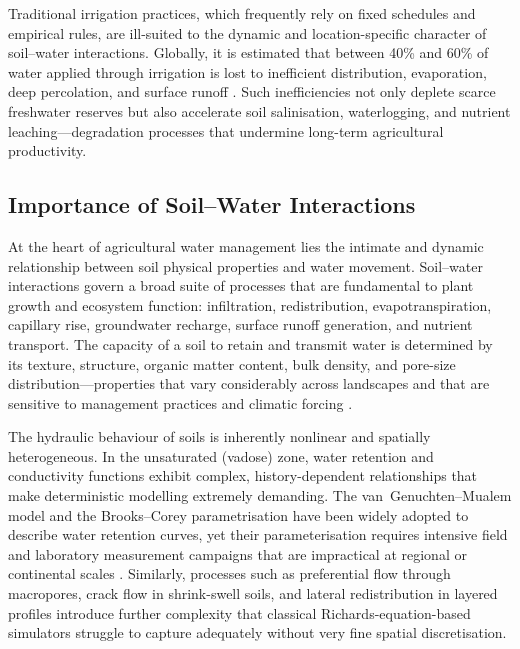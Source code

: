 \documentclass[land,article,submit,pdftex,moreauthors]{Definitions/mdpi}
\numberwithin{equation}{section}
\begin{document}
Traditional irrigation practices, which frequently rely on fixed schedules and empirical rules, are ill-suited to the dynamic and location-specific character of soil--water interactions. Globally, it is estimated that between 40\% and 60\% of water applied through irrigation is lost to inefficient distribution, evaporation, deep percolation, and surface runoff \citep{gleick2014water}. Such inefficiencies not only deplete scarce freshwater reserves but also accelerate soil salinisation, waterlogging, and nutrient leaching---degradation processes that undermine long-term agricultural productivity.

\subsection{Importance of Soil--Water Interactions}

At the heart of agricultural water management lies the intimate and dynamic relationship between soil physical properties and water movement. Soil--water interactions govern a broad suite of processes that are fundamental to plant growth and ecosystem function: infiltration, redistribution, evapotranspiration, capillary rise, groundwater recharge, surface runoff generation, and nutrient transport. The capacity of a soil to retain and transmit water is determined by its texture, structure, organic matter content, bulk density, and pore-size distribution---properties that vary considerably across landscapes and that are sensitive to management practices and climatic forcing \citep{hillel2004introduction}.

The hydraulic behaviour of soils is inherently nonlinear and spatially heterogeneous. In the unsaturated (vadose) zone, water retention and conductivity functions exhibit complex, history-dependent relationships that make deterministic modelling extremely demanding. The van~Genuchten--Mualem model and the Brooks--Corey parametrisation have been widely adopted to describe water retention curves, yet their parameterisation requires intensive field and laboratory measurement campaigns that are impractical at regional or continental scales \citep{vangenuchten1980closed}. Similarly, processes such as preferential flow through macropores, crack flow in shrink-swell soils, and lateral redistribution in layered profiles introduce further complexity that classical Richards-equation-based simulators struggle to capture adequately without very fine spatial discretisation.
\end{document}
